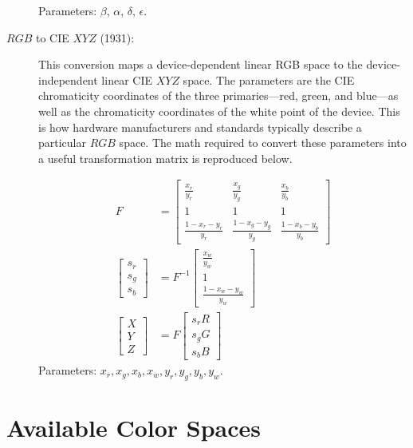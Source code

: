 \documentclass[9pt,letterpaper]{book}
\numberwithin{equation}{chapter}
\numberwithin{figure}{chapter}
\numberwithin{table}{chapter}
\begin{document}
\begin{description}
Parameters: $\beta$, $\alpha$, $\delta$, $\epsilon$.

\item[$RGB$ to CIE $XYZ$ (1931):]
\vspace{\baselineskip}\hfill

This conversion maps a device-dependent linear RGB space to the
 device-independent linear CIE $XYZ$ space.
The parameters are the CIE chromaticity coordinates of the three
 primaries---red, green, and blue---as well as the chromaticity coordinates
 of the white point of the device.
This is how hardware manufacturers and standards typically describe a
 particular $RGB$ space.
The math required to convert these parameters into a useful transformation
 matrix is reproduced below.

\begin{align}
F                  & =
\left[\begin{array}{ccc}
\frac{x_r}{y_r}       & \frac{x_g}{y_g}       & \frac{x_b}{y_b}       \\
1                     & 1                     & 1                     \\
\frac{1-x_r-y_r}{y_r} & \frac{1-x_g-y_g}{y_g} & \frac{1-x_b-y_b}{y_b}
\end{array}\right] \\
\left[\begin{array}{c}
s_r \\
s_g \\
s_b
\end{array}\right] & =
F^{-1}\left[\begin{array}{c}
\frac{x_w}{y_w} \\
1 \\
\frac{1-x_w-y_w}{y_w}
\end{array}\right] \\
\left[\begin{array}{c}
X \\
Y \\
Z
\end{array}\right] & =
F\left[\begin{array}{c}
s_rR \\
s_gG \\
s_bB
\end{array}\right]
\end{align}
Parameters: $x_r,x_g,x_b,x_w, y_r,y_g,y_b,y_w$.

\end{description}

\section{Available Color Spaces}
\label{sec:colorspaces}
\end{document}
